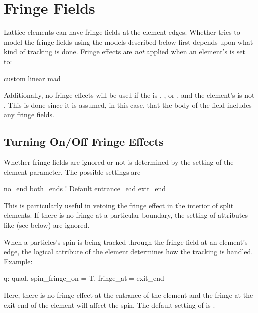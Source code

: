 \section{Fringe Fields}
\label{s:fringe}

Lattice elements can have fringe fields at the element edges. Whether \bmad tries to model
the fringe fields using the models described below first depends upon what kind of
tracking is done. Fringe effects are {\em not} applied when an element's
 is set to:
\begin{example}
  custom
  linear
  mad
\end{example}
Additionally, no fringe effects will be used if the  is ,
, or , and the element's  is not
. This is done since it is assumed, in this case, that the body of the
field includes any fringe fields.

\subsection{Turning On/Off Fringe Effects}
\label{s:fringe.at}

Whether fringe fields are ignored or not is determined by the setting of the
 element parameter. The possible settings are
\begin{example}
  no_end         
  both_ends             ! Default
  entrance_end
  exit_end
\end{example}
This is particularly useful in vetoing the fringe effect in the interior of split
elements. If there is no fringe at a particular boundary, the setting of attributes
like  (see below) are ignored.

When a particles's spin is being tracked through the fringe field at an element's edge,
the  logical attribute of the element determines how the tracking is handled.
Example:
\begin{example}
  q: quad, spin_fringe_on = T, fringe_at = exit_end
\end{example}
Here, there is no fringe effect at the entrance of the element and the fringe at the exit
end of the element will affect the spin. The default setting of  is
.

